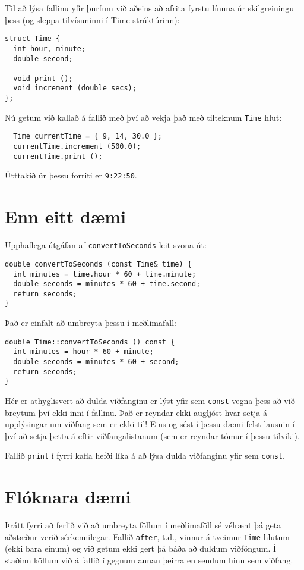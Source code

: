 {Til að lýsa fallinu yfir þurfum við aðeins að afrita fyrstu línuna úr skilgreiningu þess (og sleppa tilvísuninni í Time strúktúrinn):

\begin{verbatim}
struct Time {
  int hour, minute;
  double second;

  void print ();
  void increment (double secs);
};
\end{verbatim}
%
Nú getum við kallað á fallið með því að vekja það með tilteknum {\tt Time} hlut:

\begin{verbatim}
  Time currentTime = { 9, 14, 30.0 };
  currentTime.increment (500.0);
  currentTime.print ();
\end{verbatim}
%
Útttakið úr þessu forriti er {\tt 9:22:50}.

\section{Enn eitt dæmi}

Upphaflega útgáfan af {\tt convertToSeconds} leit svona út:

\begin{verbatim}
double convertToSeconds (const Time& time) {
  int minutes = time.hour * 60 + time.minute;
  double seconds = minutes * 60 + time.second;
  return seconds;
}
\end{verbatim}
%
Það er einfalt að umbreyta þessu í meðlimafall: 

\begin{verbatim}
double Time::convertToSeconds () const {
  int minutes = hour * 60 + minute;
  double seconds = minutes * 60 + second;
  return seconds;
}
\end{verbatim}
%
Hér er athyglisvert að dulda viðfanginu er lýst yfir sem 
{\tt const} vegna þess að við breytum því ekki inni í fallinu. 
Það er reyndar ekki augljóst hvar setja á upplýsingar um viðfang sem er ekki til!
Eins og sést í þessu dæmi felst lausnin í því að setja þetta á eftir viðfangalistanum (sem er reyndar tómur í þessu tilviki).

Fallið {\tt print} í fyrri kafla hefði líka á að lýsa dulda viðfanginu yfir sem {\tt const}.

\section {Flóknara dæmi}

Þrátt fyrri að ferlið við að umbreyta föllum í meðlimaföll sé vélrænt þá geta aðstæður verið sérkennilegar.
Fallið {\tt after}, t.d., vinnur á tveimur {\tt Time} hlutum (ekki bara einum) og við getum ekki gert þá báða að duldum viðföngum.
Í staðinn köllum við á fallið í gegnum annan þeirra en sendum hinn sem viðfang.

}

